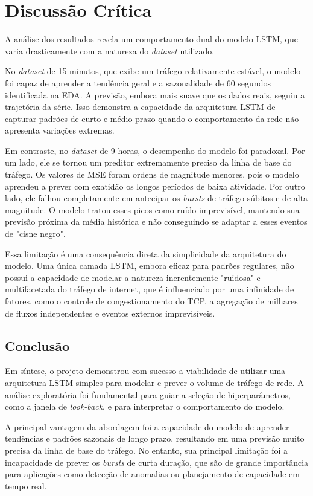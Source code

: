 \clearpage
\section{Discussão Crítica}

A análise dos resultados revela um comportamento dual do modelo LSTM, que varia drasticamente com a natureza
do \emph{dataset} utilizado.

No \emph{dataset} de 15 minutos, que exibe um tráfego relativamente estável, o modelo foi capaz de aprender a
tendência geral e a sazonalidade de 60 segundos identificada na EDA. A previsão, embora mais suave que os
dados reais, seguiu a trajetória da série. Isso demonstra a capacidade da arquitetura LSTM de capturar
padrões de curto e médio prazo quando o comportamento da rede não apresenta variações extremas.

Em contraste, no \emph{dataset} de 9 horas, o desempenho do modelo foi paradoxal. Por um lado, ele se tornou
um preditor extremamente preciso da linha de base do tráfego. Os valores de MSE foram ordens de magnitude
menores, pois o modelo aprendeu a prever com exatidão os longos períodos de baixa atividade. Por outro lado,
ele falhou completamente em antecipar os \emph{bursts} de tráfego súbitos e de alta magnitude. O modelo
tratou esses picos como ruído imprevisível, mantendo sua previsão próxima da média histórica e não
conseguindo se adaptar a esses eventos de "cisne negro".

Essa limitação é uma consequência direta da simplicidade da arquitetura do modelo. Uma única camada LSTM,
embora eficaz para padrões regulares, não possui a capacidade de modelar a natureza inerentemente "ruidosa" e
multifacetada do tráfego de internet, que é influenciado por uma infinidade de fatores, como o controle de
congestionamento do TCP, a agregação de milhares de fluxos independentes e eventos externos imprevisíveis.

\subsection{Conclusão}

Em síntese, o projeto demonstrou com sucesso a viabilidade de utilizar uma arquitetura LSTM simples para
modelar e prever o volume de tráfego de rede. A análise exploratória foi fundamental para guiar a seleção de
hiperparâmetros, como a janela de \emph{look-back}, e para interpretar o comportamento do modelo.

A principal vantagem da abordagem foi a capacidade do modelo de aprender tendências e padrões sazonais de
longo prazo, resultando em uma previsão muito precisa da linha de base do tráfego. No entanto, sua principal
limitação foi a incapacidade de prever os \emph{bursts} de curta duração, que são de grande importância para
aplicações como detecção de anomalias ou planejamento de capacidade em tempo real.

